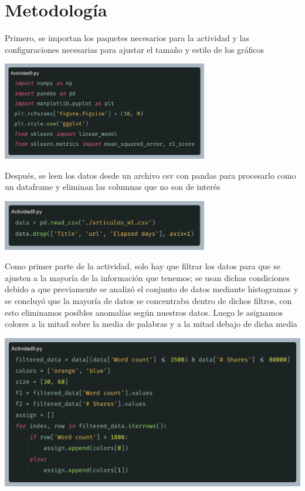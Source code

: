 \documentclass[12pt, letterpaper]{article}
\begin{document}
    \section{Metodología}
    Primero, se importan los paquetes necesarios para la actividad y las configuraciones necesarias para ajustar el tamaño y estilo de los gráficos
    \begin{center}
        \includegraphics[width=90mm]{2025-03-23-22-52-59.png}
    \end{center}
    Después, se leen los datos desde un archivo csv con pandas para procesarlo como un dataframe y eliminan las columnas que no son de interés
    \begin{center}
        \includegraphics[width=90mm]{2025-03-23-23-20-45.png}
    \end{center}
    Como primer parte de la actividad, solo hay que filtrar los datos para que se ajusten a la mayoría de la información que tenemos; se usan dichas condiciones debido a que previamente se analizó el conjunto de datos mediante histogramas y se concluyó que la mayoría de datos se concentraba dentro de dichos filtros, con esto eliminamos posibles anomalías según nuestros datos. Luego le asignamos colores a la mitad sobre la media de palabras y a la mitad debajo de dicha media
    \begin{center}
        \includegraphics[width=140mm]{2025-03-23-23-24-51.png}
    \end{center}
\end{document}
